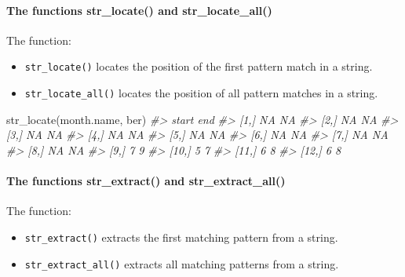 \documentclass[
]{book}
\newenvironment{Shaded}{\begin{snugshade}}{\end{snugshade}}
\newcommand{\CommentTok}[1]{\textcolor[rgb]{0.56,0.35,0.01}{\textit{#1}}}
\newcommand{\FunctionTok}[1]{\textcolor[rgb]{0.00,0.00,0.00}{#1}}
\newcommand{\NormalTok}[1]{#1}
\newcommand{\StringTok}[1]{\textcolor[rgb]{0.31,0.60,0.02}{#1}}
\providecommand{\tightlist}{%
  \setlength{\itemsep}{0pt}\setlength{\parskip}{0pt}}
\begin{document}
\hypertarget{the-functions-str_locate-and-str_locate_all}{%
\paragraph{The functions str\_locate() and str\_locate\_all()}\label{the-functions-str_locate-and-str_locate_all}}

The function:

\begin{itemize}
\tightlist
\item
  \texttt{str\_locate()} locates the position of the first pattern match in a string.
\item
  \texttt{str\_locate\_all()} locates the position of all pattern matches in a string.
\end{itemize}

\begin{Shaded}
\begin{Highlighting}[]
\FunctionTok{str\_locate}\NormalTok{(month.name, }\StringTok{\textquotesingle{}ber\textquotesingle{}}\NormalTok{)}
\CommentTok{\#\textgreater{}       start end}
\CommentTok{\#\textgreater{}  [1,]    NA  NA}
\CommentTok{\#\textgreater{}  [2,]    NA  NA}
\CommentTok{\#\textgreater{}  [3,]    NA  NA}
\CommentTok{\#\textgreater{}  [4,]    NA  NA}
\CommentTok{\#\textgreater{}  [5,]    NA  NA}
\CommentTok{\#\textgreater{}  [6,]    NA  NA}
\CommentTok{\#\textgreater{}  [7,]    NA  NA}
\CommentTok{\#\textgreater{}  [8,]    NA  NA}
\CommentTok{\#\textgreater{}  [9,]     7   9}
\CommentTok{\#\textgreater{} [10,]     5   7}
\CommentTok{\#\textgreater{} [11,]     6   8}
\CommentTok{\#\textgreater{} [12,]     6   8}
\end{Highlighting}
\end{Shaded}

\hypertarget{the-functions-str_extract-and-str_extract_all}{%
\paragraph{The functions str\_extract() and str\_extract\_all()}\label{the-functions-str_extract-and-str_extract_all}}

The function:

\begin{itemize}
\tightlist
\item
  \texttt{str\_extract()} extracts the first matching pattern from a string.
\item
  \texttt{str\_extract\_all()} extracts all matching patterns from a string.
\end{itemize}
\end{document}
